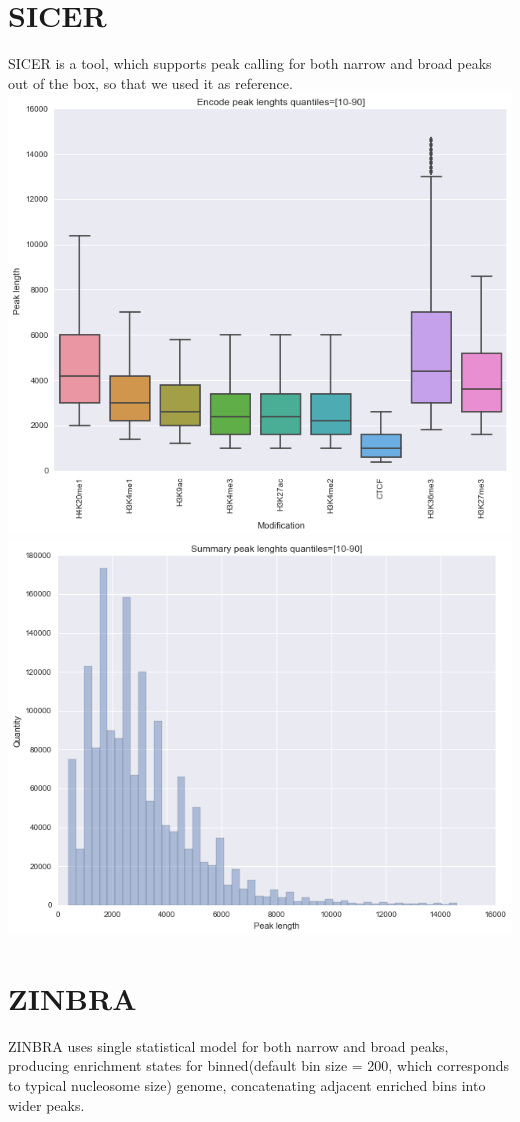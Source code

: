\documentclass{article}
\begin{document}
\section{SICER}
SICER is a tool, which supports peak calling for both narrow and broad peaks out of the box, so that we used it as reference.
\includegraphics[width=0.5\linewidth]{sicer.png}
\includegraphics[width=0.5\linewidth]{sicer2.png}

\section{ZINBRA}
ZINBRA uses single statistical model for both narrow and broad peaks, producing enrichment states for binned(default bin size = 200, which corresponds to typical nucleosome size) genome, concatenating adjacent enriched bins into wider peaks.
\end{document}
